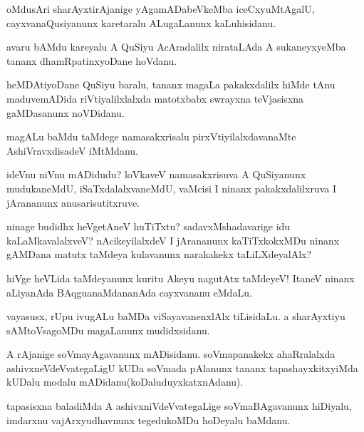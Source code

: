 \documentclass{article}
\begin{document}
\begin{mn}%
oMdusAri sharAyxtirAjanige yAgamADabeVkeMba iceCxyuMtAgalU, cayxvanaQusiyanunx karetaralu 
ALugaLanunx kaLuhisidanu.
\end{mn}

\begin{mn}%
avaru bAMdu kareyalu A QuSiyu AcAradalilx nirataLAda A sukaneyxyeMba tananx dhamRpatinxyoDane
hoVdanu.
\end{mn}

\begin{mn}%
heMDAtiyoDane QuSiyu baralu, tananx magaLa pakakxdalilx hiMde tAnu maduvemADida 
riVtiyalilxlalxda matotxbabx swrayxna teVjasisxna gaMDasanunx noVDidanu.
\end{mn}

\begin{mn}%
magALu baMdu taMdege namasakxrisalu pirxVtiyilalxdavanaMte AshiVravxdisadeV iMtMdanu.
\end{mn}

\begin{mn}%
ideVnu niVnu mADidudu? loVkaveV namasakxrisuva A QuSiyanunx mudukaneMdU, 
iSaTxdalalxvaneMdU, vaMcisi I ninanx pakakxdalilxruva I jArananunx anusarisutitxruve.
\end{mn}

\begin{mn}%
ninage budidhx heVgetAneV huTiTxtu? sadavxMshadavarige idu kaLaMkavalalxveV? 
nAcikeyilalxdeV I jArananunx kaTiTxkokxMDu ninanx gAMDana matutx taMdeya kulavanunx 
narakakekx taLiLXdeyalAlx?
\end{mn}

\begin{mn}%
hiVge heVLida taMdeyanunx kuritu Akeyu nagutAtx taMdeyeV! ItaneV ninanx aLiyanAda 
BAqguanaMdananAda cayxvananu eMdaLu.
\end{mn}

\begin{mn}%
vayasusx, rUpu ivugALu baMDa viSayavanenxlAlx tiLisidaLu. a sharAyxtiyu sAMtoVsagoMDu 
magaLanunx mudidxsidanu.
\end{mn}

\begin{mn}%
A rAjanige soVmayAgavanunx mADisidanu. soVmapanakekx ahaRralalxda ashivxneVdeVvategaLigU 
kUDa soVmada pAlanunx tananx tapashayxkitxyiMda kUDalu modalu mADidanu(koDaluduyxkatxnAdanu).
\end{mn}

\begin{mn}%
tapasisxna baladiMda A ashivxniVdeVvategaLige soVmaBAgavanunx hiDiyalu, imdarxnu 
vajArxyudhavnunx tegedukoMDu hoDeyalu baMdanu.
\end{mn}
\end{document}
